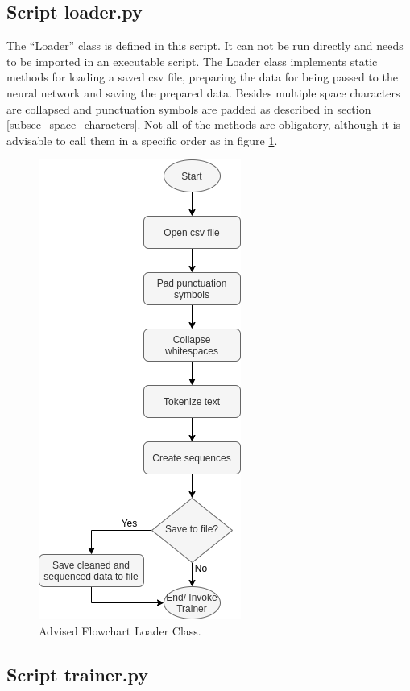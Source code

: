 \documentclass[conference]{IEEEtran}
\begin{document}
\subsection{Script loader.py}\label{subsec_loader}

The ``Loader'' class is defined in this script. It can not be run directly and needs to be imported in an executable script. The Loader class implements static methods for loading a saved csv file, preparing the data for being passed to the neural network and saving the prepared data. Besides multiple space characters are collapsed and punctuation symbols are padded as described in section \ref{subsec_space_characters}. Not all of the methods are obligatory, although it is advisable to call them in a specific order as in figure \ref{fig:flowchart_loader}. 

\begin{figure}[htbp]
\centerline{\includegraphics[scale=0.65]{pictures/flowchart_loader.png}}
\caption{Advised Flowchart Loader Class.}
\label{fig:flowchart_loader}
\end{figure}

\subsection{Script trainer.py}\label{subsec_trainer}
\end{document}
